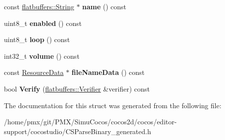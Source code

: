 \begin{DoxyCompactItemize}
\item 
\mbox{\label{structflatbuffers_1_1ComAudioOptions_a0109314885358ce66f39e825d4106056}} 
const \hyperlink{structflatbuffers_1_1String}{flatbuffers\+::\+String} $\ast$ {\bfseries name} () const
\item 
\mbox{\label{structflatbuffers_1_1ComAudioOptions_aa6c8bf8192ba07e5bcd627cf2e6dd72b}} 
uint8\+\_\+t {\bfseries enabled} () const
\item 
\mbox{\label{structflatbuffers_1_1ComAudioOptions_a556b2409aee74cd28b74b07fb18e248a}} 
uint8\+\_\+t {\bfseries loop} () const
\item 
\mbox{\label{structflatbuffers_1_1ComAudioOptions_a7e3223571b06a8df5c2584110059742a}} 
int32\+\_\+t {\bfseries volume} () const
\item 
\mbox{\label{structflatbuffers_1_1ComAudioOptions_a3d998634b9fb49dc40d8715fdb447890}} 
const \hyperlink{structflatbuffers_1_1ResourceData}{Resource\+Data} $\ast$ {\bfseries file\+Name\+Data} () const
\item 
\mbox{\label{structflatbuffers_1_1ComAudioOptions_aaca667b5cc86b959e85ec489934a747d}} 
bool {\bfseries Verify} (\hyperlink{classflatbuffers_1_1Verifier}{flatbuffers\+::\+Verifier} \&verifier) const
\end{DoxyCompactItemize}


The documentation for this struct was generated from the following file\+:\begin{DoxyCompactItemize}
\item 
/home/pmx/git/\+P\+M\+X/\+Simu\+Cocos/cocos2d/cocos/editor-\/support/cocostudio/C\+S\+Parse\+Binary\+\_\+generated.\+h\end{DoxyCompactItemize}
